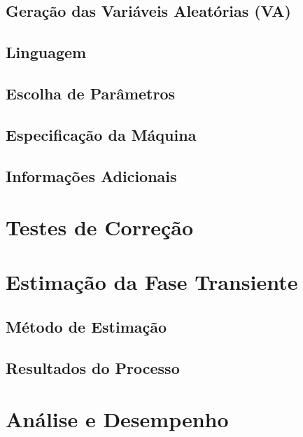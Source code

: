 \documentclass[a4paper,12pt]{report}
\begin{document}
\section{Geração das Variáveis Aleatórias (VA)}

\section{Linguagem}

\section{Escolha de Parâmetros}

\section{Especificação da Máquina}

\section{Informações Adicionais}

\chapter{Testes de Correção}

\chapter{Estimação da Fase Transiente}

\section{Método de Estimação}

\section{Resultados do Processo}

\chapter{Análise e Desempenho}


\end{document}
